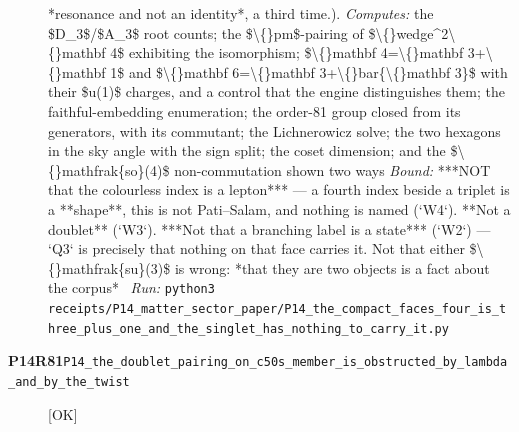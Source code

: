 \begin{description}
*resonance and not an identity*, a third time.). 
\emph{Computes:} the \$D\_3\$/\$A\_3\$ root counts; the \$\textbackslash\{\}pm\$-pairing of \$\textbackslash\{\}wedge\textasciicircum{}2\textbackslash\{\}mathbf 4\$ exhibiting the isomorphism; \$\textbackslash\{\}mathbf 4=\textbackslash\{\}mathbf 3+\textbackslash\{\}mathbf 1\$ and \$\textbackslash\{\}mathbf 6=\textbackslash\{\}mathbf 3+\textbackslash\{\}bar\{\textbackslash\{\}mathbf 3\}\$ with their \$u(1)\$ charges, and a control that the engine distinguishes them; the faithful-embedding enumeration; the order-81 group closed from its generators, with its commutant; the Lichnerowicz solve; the two hexagons in the sky angle with the sign split; the coset dimension; and the \$\textbackslash\{\}mathfrak\{so\}(4)\$ non-commutation shown two ways
 \emph{Bound:}  ***NOT that the colourless index is a lepton*** --- a fourth index beside a triplet is a **shape**, this is not Pati--Salam, and nothing is named (`W4`). **Not a doublet** (`W3`). ***Not that a branching label is a state*** (`W2`) --- `Q3` is precisely that nothing on that face carries it. Not that either \$\textbackslash\{\}mathfrak\{su\}(3)\$ is wrong: *that they are two objects is a fact about the corpus*
\ \emph{Run:} \texttt{python3 receipts/P14\_matter\_sector\_paper/P14\_the\_compact\_faces\_four\_is\_three\_plus\_one\_and\_the\_singlet\_has\_nothing\_to\_carry\_it.py}
\item[\rcptlabel{P14_the_doublet_pairing_on_c50s_member_is_obstructed_by_lambda_and_by_the_twist}{P14R81}\textbf{P14R81}\quad\texttt{P14\_the\_doublet\_pairing\_on\_c50s\_member\_is\_obstructed\_by\_lambda\_and\_by\_the\_twist}]\hfill\textsf{[OK]}\\

\end{description}
